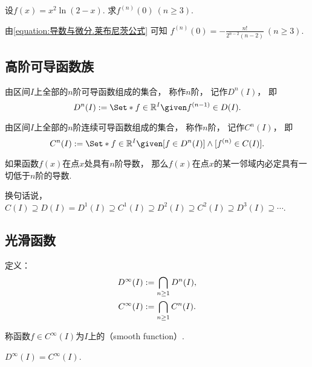 \begin{example}
设\(f(x) = x^2 \ln(2-x)\).
求\(f^{(n)}(0)\ (n\geq3)\).
\begin{solution}
由\cref{equation:导数与微分.莱布尼茨公式} 可知
\(f^{(n)}(0) = -\frac{n!}{2^{n-2} (n-2)}\ (n\geq3)\).
\end{solution}
\end{example}

\subsection{高阶可导函数族}
\begin{definition}\label{definition:函数族.n阶可导函数族}
由区间\(I\)上全部的\(n\)阶可导函数组成的集合，
称作\(n\)阶，
记作\(D^n(I)\)，
即\begin{equation*}
	D^n(I)
	\defeq
	\Set*{
		f\in\mathbb{R}^I
		\given
		f^{(n-1)} \in D(I)
	}.
\end{equation*}
\end{definition}

\begin{definition}\label{definition:函数族.n阶连续可导函数族}
由区间\(I\)上全部的\(n\)阶连续可导函数组成的集合，
称作\(n\)阶，
记作\(C^n(I)\)，
即\begin{equation*}
	C^n(I)
	\defeq
	\Set*{
		f\in\mathbb{R}^I
		\given
		[f\in D^n(I)]
		\land
		[f^{(n)}\in C(I)]
	}.
\end{equation*}
\end{definition}

\begin{theorem}
如果函数\(f(x)\)在点\(x\)处具有\(n\)阶导数，
那么\(f(x)\)在点\(x\)的某一邻域内必定具有一切低于\(n\)阶的导数.
\end{theorem}
换句话说，\(C(I) \supseteq
D(I) = D^1(I) \supseteq
C^1(I) \supseteq
D^2(I) \supseteq
C^2(I) \supseteq
D^3(I) \supseteq
\dotsb\).

\subsection{光滑函数}
\begin{definition}\label{definition:函数族.光滑函数族}
定义：\begin{gather*}
	D^\infty (I) := \bigcap_{n\geq1} D^n(I), \\
	C^\infty (I) := \bigcap_{n\geq1} C^n(I).
\end{gather*}

称函数\(f \in C^\infty (I)\)为\(I\)上的（smooth function）.
\end{definition}

\begin{property}\label{theorem:函数族.光滑函数族的性质1}
\(D^\infty (I) = C^\infty (I)\).
\end{property}

